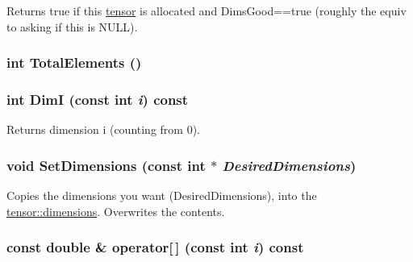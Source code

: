 Returns true if this \hyperlink{classJKBuilder_1_1tensor}{tensor} is allocated and DimsGood==true (roughly the equiv to asking if this is NULL). \hypertarget{classJKBuilder_1_1tensor_a537b2f14296e2f0e62f00e1703c5fa08}{
\subsubsection[{TotalElements}]{\setlength{\rightskip}{0pt plus 5cm}int TotalElements ()}}
\label{classJKBuilder_1_1tensor_a537b2f14296e2f0e62f00e1703c5fa08}
\hypertarget{classJKBuilder_1_1tensor_a6bdcfca6493bc217b607317dbceb28b2}{
\subsubsection[{DimI}]{\setlength{\rightskip}{0pt plus 5cm}int DimI (const int {\em i}) const}}
\label{classJKBuilder_1_1tensor_a6bdcfca6493bc217b607317dbceb28b2}


Returns dimension i (counting from 0). \hypertarget{classJKBuilder_1_1tensor_ace6bcf62c74395ab9e37abc4935f66e0}{
\subsubsection[{SetDimensions}]{\setlength{\rightskip}{0pt plus 5cm}void SetDimensions (const int $\ast$ {\em DesiredDimensions})}}
\label{classJKBuilder_1_1tensor_ace6bcf62c74395ab9e37abc4935f66e0}


Copies the dimensions you want (DesiredDimensions), into the \hyperlink{classJKBuilder_1_1tensor_a2ce1e6e0782ddee097f2c4aa2663d3e9}{tensor::dimensions}. Overwrites the contents. \hypertarget{classJKBuilder_1_1tensor_a4f0dc1b84b580cec49500c70f87e084a}{
\subsubsection[{operator[]}]{\setlength{\rightskip}{0pt plus 5cm}const double \& operator\mbox{[}$\,$\mbox{]} (const int {\em i}) const}}
\label{classJKBuilder_1_1tensor_a4f0dc1b84b580cec49500c70f87e084a}


